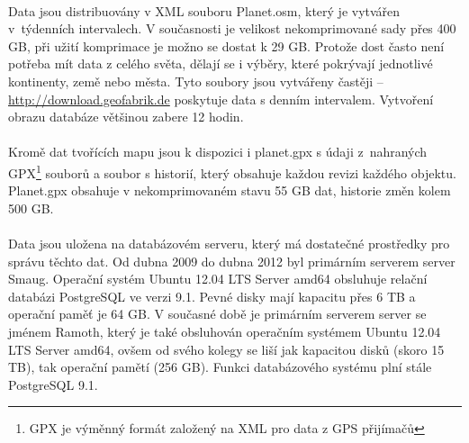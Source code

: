 \documentclass[11pt,a4paper,titlepage,oneside]{book}
\begin{document}

		\paragraph{} Data jsou distribuovány v XML souboru Planet.osm, který je vytvářen v~týdenních intervalech. V současnosti je velikost nekomprimované sady přes 400 GB, při užití komprimace je možno se dostat k 29 GB. Protože dost často není potřeba mít data z celého světa, dělají se i výběry, které pokrývají jednotlivé kontinenty, země nebo města. Tyto soubory jsou vytvářeny častěji -- \url{http://download.geofabrik.de} poskytuje data s denním intervalem. Vytvoření obrazu databáze většinou zabere 12 hodin\cite{planet.osm}.


	\paragraph{} Kromě dat tvořících mapu jsou k dispozici i planet.gpx s údaji z~nahraných \ac{GPX}\footnote{\ac{GPX} je výměnný formát založený na \ac{XML} pro data z GPS přijímačů} souborů a soubor s historií, který obsahuje každou revizi každého objektu. Planet.gpx obsahuje v nekomprimovaném stavu 55 GB dat, historie změn kolem 500 GB\cite{osm_wiki_planet.gpx}. 


	\paragraph{} Data jsou uložena na databázovém serveru, který má dostatečné prostředky pro správu těchto dat. Od dubna 2009 do dubna 2012 byl primárním serverem server Smaug\cite{osm_wiki_smaug}. Operační systém Ubuntu 12.04 LTS Server amd64 obsluhuje relační databázi PostgreSQL ve verzi 9.1. Pevné disky mají kapacitu přes 6 TB a operační paměť je 64 GB. V současné době je primárním serverem server se jménem Ramoth\cite{osm_wiki_ramoth}, který je také obsluhován operačním systémem Ubuntu 12.04 LTS Server amd64, ovšem od svého kolegy se liší jak kapacitou disků (skoro 15 TB), tak operační pamětí (256 GB). Funkci databázového systému plní stále PostgreSQL 9.1.
\end{document}
